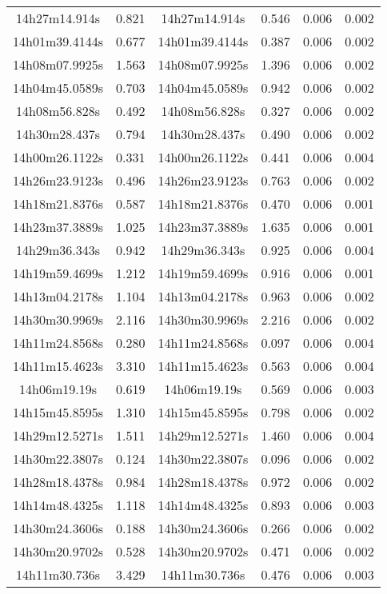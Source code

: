 \begin{table}
\begin{tabular}{cccccc}
14h27m14.914s & 0.821 & 14h27m14.914s & 0.546 & 0.006 & 0.002 \\
14h01m39.4144s & 0.677 & 14h01m39.4144s & 0.387 & 0.006 & 0.002 \\
14h08m07.9925s & 1.563 & 14h08m07.9925s & 1.396 & 0.006 & 0.002 \\
14h04m45.0589s & 0.703 & 14h04m45.0589s & 0.942 & 0.006 & 0.002 \\
14h08m56.828s & 0.492 & 14h08m56.828s & 0.327 & 0.006 & 0.002 \\
14h30m28.437s & 0.794 & 14h30m28.437s & 0.490 & 0.006 & 0.002 \\
14h00m26.1122s & 0.331 & 14h00m26.1122s & 0.441 & 0.006 & 0.004 \\
14h26m23.9123s & 0.496 & 14h26m23.9123s & 0.763 & 0.006 & 0.002 \\
14h18m21.8376s & 0.587 & 14h18m21.8376s & 0.470 & 0.006 & 0.001 \\
14h23m37.3889s & 1.025 & 14h23m37.3889s & 1.635 & 0.006 & 0.001 \\
14h29m36.343s & 0.942 & 14h29m36.343s & 0.925 & 0.006 & 0.004 \\
14h19m59.4699s & 1.212 & 14h19m59.4699s & 0.916 & 0.006 & 0.001 \\
14h13m04.2178s & 1.104 & 14h13m04.2178s & 0.963 & 0.006 & 0.002 \\
14h30m30.9969s & 2.116 & 14h30m30.9969s & 2.216 & 0.006 & 0.002 \\
14h11m24.8568s & 0.280 & 14h11m24.8568s & 0.097 & 0.006 & 0.004 \\
14h11m15.4623s & 3.310 & 14h11m15.4623s & 0.563 & 0.006 & 0.004 \\
14h06m19.19s & 0.619 & 14h06m19.19s & 0.569 & 0.006 & 0.003 \\
14h15m45.8595s & 1.310 & 14h15m45.8595s & 0.798 & 0.006 & 0.002 \\
14h29m12.5271s & 1.511 & 14h29m12.5271s & 1.460 & 0.006 & 0.004 \\
14h30m22.3807s & 0.124 & 14h30m22.3807s & 0.096 & 0.006 & 0.002 \\
14h28m18.4378s & 0.984 & 14h28m18.4378s & 0.972 & 0.006 & 0.002 \\
14h14m48.4325s & 1.118 & 14h14m48.4325s & 0.893 & 0.006 & 0.003 \\
14h30m24.3606s & 0.188 & 14h30m24.3606s & 0.266 & 0.006 & 0.002 \\
14h30m20.9702s & 0.528 & 14h30m20.9702s & 0.471 & 0.006 & 0.002 \\
14h11m30.736s & 3.429 & 14h11m30.736s & 0.476 & 0.006 & 0.003 \\

\end{tabular}
\end{table}

